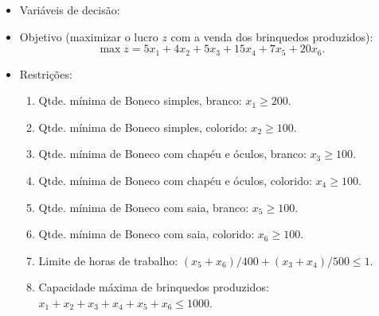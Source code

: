 \documentclass[12pt]{article}
\begin{document}
%
\begin{tcolorbox}[rounded corners, breakable,colback=yellow!5, colframe=red!40!black, title=\textbf{Modelo PL para o problema P-\myprob}]
 \begin{itemize}[topsep=0pt]
  \item Variáveis de decisão:
%
  \item Objetivo (maximizar o lucro $z$ com a venda dos brinquedos produzidos):
   $$\max z= 5x_1 + 4x_2 + 5x_3 + 15x_4 + 7x_5 + 20x_6.$$
%
  \item Restrições:
   \begin{enumerate}[topsep=0pt,itemsep=0pt]
    \item Qtde. mínima de Boneco simples, branco: $x_1 \geqslant 200$.
    \item Qtde. mínima de Boneco simples, colorido: $x_2 \geqslant 100$.
    \item Qtde. mínima de Boneco com chapéu e óculos, branco: $x_3 \geqslant 100$.
    \item Qtde. mínima de Boneco com chapéu e óculos, colorido: $x_4 \geqslant 100$.
    \item Qtde. mínima de Boneco com saia, branco: $x_5 \geqslant 100$.
    \item Qtde. mínima de Boneco com saia, colorido: $x_6 \geqslant 100$.
    \item Limite de horas de trabalho: $(x_5 + x_6)/400 + (x_3+x_4)/500 \leqslant 1$.
    \item Capacidade máxima de brinquedos produzidos: $ x_1 + x_2 + x_3 + x_4 + x_5 + x_6 \leqslant 1000$.

\end{enumerate}
\end{itemize}
\end{tcolorbox}
\end{document}
